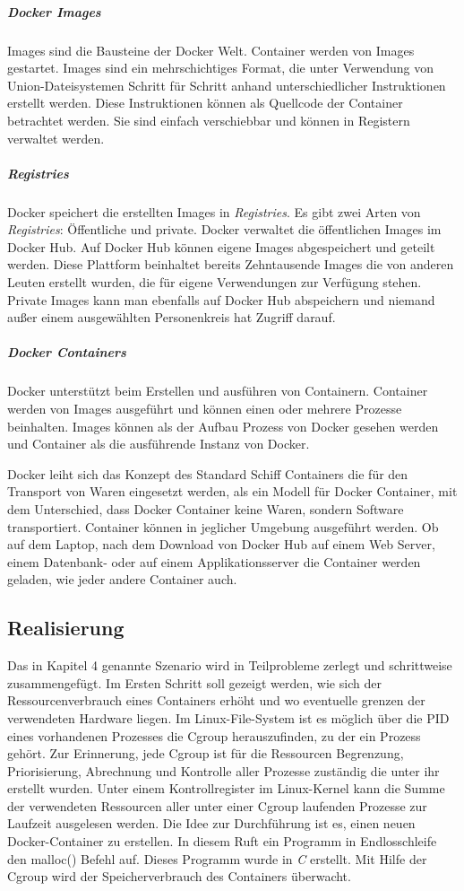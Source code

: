 \subparagraph{Docker Images}
Images sind die Bausteine der Docker Welt. Container werden von Images gestartet. Images sind ein mehrschichtiges Format, die unter Verwendung von Union-Dateisystemen Schritt für Schritt anhand unterschiedlicher Instruktionen erstellt werden. Diese Instruktionen können als Quellcode der Container betrachtet werden. Sie sind einfach verschiebbar und können in Registern verwaltet werden.

\subparagraph{Registries}
Docker speichert die erstellten Images in \emph{Registries}. Es gibt zwei Arten von \emph{Registries}: Öffentliche und private. Docker verwaltet die öffentlichen Images im Docker Hub\cite{DockerInc.2016DockerHub}. Auf Docker Hub können eigene Images abgespeichert und geteilt werden. Diese Plattform beinhaltet bereits Zehntausende Images die von anderen Leuten erstellt wurden, die für eigene Verwendungen zur Verfügung stehen. Private Images kann man ebenfalls auf Docker Hub abspeichern und niemand außer einem ausgewählten Personenkreis hat Zugriff darauf.

\subparagraph{Docker Containers}
Docker unterstützt beim Erstellen und ausführen von Containern. Container werden von Images ausgeführt und können einen oder mehrere Prozesse beinhalten. Images können als der Aufbau Prozess von Docker gesehen werden und Container als die ausführende Instanz von Docker.

Docker leiht sich das Konzept des Standard Schiff Containers die für den Transport von Waren eingesetzt werden, als ein Modell für Docker Container, mit dem Unterschied, dass Docker Container keine Waren, sondern Software transportiert. Container können in jeglicher Umgebung ausgeführt werden. Ob auf dem Laptop, nach dem Download von Docker Hub auf einem Web Server, einem Datenbank- oder auf einem Applikationsserver die Container werden geladen, wie jeder andere Container auch.

\pagebreak

\subsection{Realisierung}
Das in Kapitel 4 genannte Szenario wird in Teilprobleme zerlegt und schrittweise zusammengefügt. Im Ersten Schritt soll gezeigt werden, wie sich der Ressourcenverbrauch eines Containers erhöht und wo eventuelle grenzen der verwendeten Hardware liegen. Im Linux-File-System ist es möglich über die PID eines vorhandenen Prozesses die Cgroup herauszufinden, zu der ein Prozess gehört. Zur Erinnerung, jede Cgroup ist für die Ressourcen Begrenzung, Priorisierung, Abrechnung und Kontrolle aller Prozesse zuständig die unter ihr erstellt wurden. Unter einem Kontrollregister im Linux-Kernel kann die Summe der verwendeten Ressourcen aller unter einer Cgroup laufenden Prozesse zur Laufzeit ausgelesen werden. Die Idee zur Durchführung ist es, einen neuen Docker-Container zu erstellen. In diesem Ruft ein Programm in Endlosschleife den malloc() Befehl auf. Dieses Programm wurde in \emph{C} erstellt. Mit Hilfe der Cgroup wird der Speicherverbrauch des Containers überwacht.

